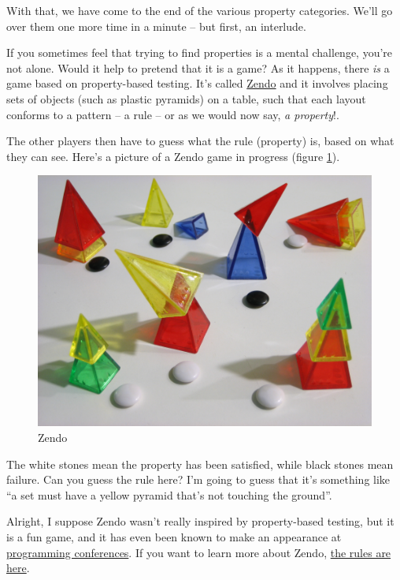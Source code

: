 With that, we have come to the end of the various property categories.
We'll go over them one more time in a minute -- but first, an interlude.

If you sometimes feel that trying to find properties is a mental
challenge, you're not alone. Would it help to pretend that it is a game?
As it happens, there \emph{is} a game based on property-based testing.
It's called \href{http://boardgamegeek.com/boardgame/6830/zendo}{Zendo}
and it involves placing sets of objects (such as plastic pyramids) on a
table, such that each layout conforms to a pattern -- a rule -- or as we
would now say, \emph{a property}!.

The other players then have to guess what the rule (property) is, based
on what they can see.
Here's a picture of a Zendo game in progress (figure \ref{fig:zendo}).

\begin{figure}[htbp]
\centering
\includegraphics{pics/zendo1.png}
\caption{Zendo}
\label{fig:zendo}
\end{figure}

The white stones mean the property has been satisfied, while black
stones mean failure. Can you guess the rule here? I'm going to guess
that it's something like ``a set must have a yellow pyramid that's not
touching the ground''.

Alright, I suppose Zendo wasn't really inspired by property-based
testing, but it is a fun game, and it has even been known to make an
appearance at
\href{http://blog.fogus.me/2014/10/23/games-of-interest-zendo/}{programming
conferences}.
If you want to learn more about Zendo,
\href{http://www.looneylabs.com/rules/zendo}{the rules are here}.

